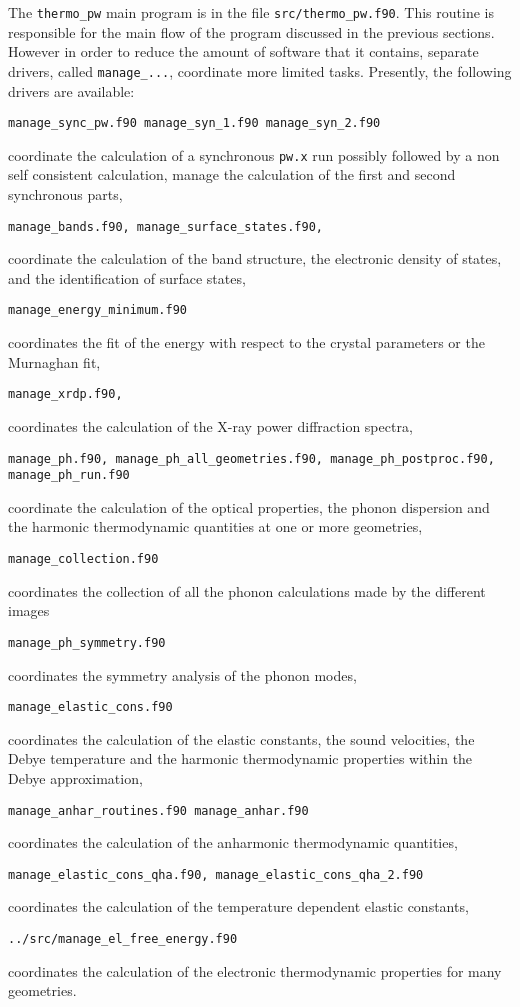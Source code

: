 \documentclass[12pt,a4paper]{article}
\begin{document}
The \texttt{thermo\_pw} main program is in the file \texttt{src/thermo\_pw.f90}.
This routine is responsible for the main flow of the program discussed
in the previous sections. However in order to reduce the amount of
software that it contains, separate drivers, called 
\texttt{manage\_...},  coordinate more limited tasks.
Presently, the following drivers are available:
\begin{verbatim}
manage_sync_pw.f90 manage_syn_1.f90 manage_syn_2.f90
\end{verbatim}
coordinate the calculation of a synchronous \texttt{pw.x} run possibly 
followed by a non self consistent calculation, manage the calculation of 
the first and second synchronous parts,
\begin{verbatim}
manage_bands.f90, manage_surface_states.f90,      
\end{verbatim}
coordinate the calculation of the band structure, the electronic density
of states, and the identification of surface states,
\begin{verbatim}
manage_energy_minimum.f90      
\end{verbatim}
coordinates the fit of the energy with respect to the crystal parameters
or the Murnaghan fit,
\begin{verbatim}
manage_xrdp.f90,                
\end{verbatim}
coordinates the calculation of the X-ray power diffraction spectra,
\begin{verbatim}
manage_ph.f90, manage_ph_all_geometries.f90, manage_ph_postproc.f90,
manage_ph_run.f90      
\end{verbatim}
coordinate the calculation of the optical properties, the phonon dispersion
and the harmonic thermodynamic quantities at one or more geometries,
\begin{verbatim}
manage_collection.f90
\end{verbatim}
coordinates the collection of all the phonon calculations made by the 
different images
\begin{verbatim}
manage_ph_symmetry.f90
\end{verbatim}
coordinates the symmetry analysis of the phonon modes,
\begin{verbatim}
manage_elastic_cons.f90        
\end{verbatim}
coordinates the calculation of the elastic constants, the sound velocities,
the Debye temperature and the harmonic thermodynamic properties within the 
Debye approximation,
\begin{verbatim}
manage_anhar_routines.f90 manage_anhar.f90               
\end{verbatim}
coordinates the calculation of the anharmonic thermodynamic quantities,
\begin{verbatim}
manage_elastic_cons_qha.f90, manage_elastic_cons_qha_2.f90        
\end{verbatim}
coordinates the calculation of the temperature dependent elastic constants,
\begin{verbatim}
../src/manage_el_free_energy.f90      
\end{verbatim}
coordinates the calculation of the electronic thermodynamic properties for
many geometries.
\end{document}
